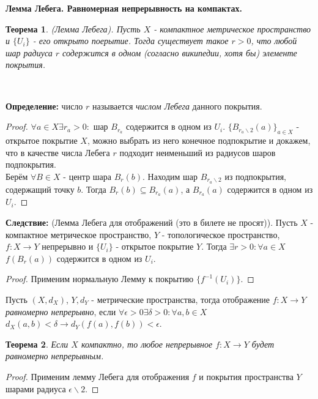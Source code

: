 \documentclass[a4paper,100pt]{article}
\theoremstyle{indented}
\newtheorem{theorem}{Теорема}
\begin{document}
\medskip

\textbf{Лемма Лебега. Равномерная непрерывность на компактах.}\\

\begin{theorem}
    (Лемма Лебега). Пусть $X$ - компактное метрическое пространство и $\{U_i\}$ - его открыто поерытие. Тогда существует такое $r>0$, что любой шар радиуса $r$ содержится в одном (согласно википедии, хотя бы) элементе покрытия.
\end{theorem}
\

\textbf{Определение:} число $r$ называется \textit{числом Лебега} данного покрытия.\

\begin{proof}
    $\forall a\in X \exists r_a>0:$ шар $B_{r_a}$ содержится в одном из $U_i$. $\{B_{r_a\backslash 2}(a)\}_{a\in X}$ - открытое покрытие $X$, можно выбрать из него конечное подпокрытие и докажем, что в качестве числа Лебега $r$ подходит неименьший из радиусов шаров подпокрытия.\\

    Берём $\forall B\in X$ - центр шара $B_r(b)$. Находим шар $B_{r_a\backslash 2}$ из подпокрытия, содержащий точку $b$. Тогда $B_r(b)\subseteq B_{r_a}(a)$, а $B_{r_a}(a)$ содержится в одном из $U_i$. 
\end{proof}

\textbf{Следствие:} (Лемма Лебега для отображений (это в билете не просят)). Пусть $X$ - компактное метрическое пространство, $Y$ - топологическое пространство, $f: X\rightarrow Y$ непрерывно и $\{U_i\}$ - открытое покрытие $Y$. Тогда $\exists r>0: \forall a\in X$ $f(B_r(a))$ содержится в одном из $U_i$.\

\begin{proof}
    Применим нормальную Лемму к покрытию $\{f^{-1}(U_i)\}$.
\end{proof}

Пусть $(X, d_X)$, $Y, d_Y$ - метрические пространства, тогда отображение $f: X\rightarrow Y$ \textit{равномерно непрерывно}, если $\forall \epsilon >0 \exists \delta >0: \forall a, b\in X$ $d_X(a,b)<\delta \rightarrow d_Y(f(a),f(b))<\epsilon$.\\

\begin{theorem}
    Если $X$ компактно, то любое непрерывное $f:X\rightarrow Y$ будет равномерно непрерывным.
\end{theorem}

\begin{proof}
    Применим лемму Лебега для отображения $f$ и покрытия пространства $Y$ шарами радиуса $\epsilon \backslash 2$.
\end{proof}
\end{document}
